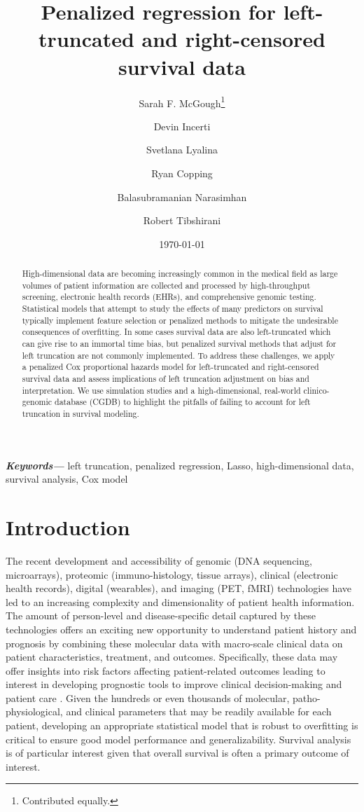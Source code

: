 \documentclass[11pt,final,fleqn]{article}\usepackage[]{graphicx}\usepackage[]{color}
\title{Penalized regression for left-truncated and right-censored survival data}
\author[1]{Sarah F. McGough\thanks{Contributed equally.}}
\author[1]{Devin Incerti\samethanks}
\author[1]{Svetlana Lyalina}
\author[1]{Ryan Copping}
\author[2, 3]{Balasubramanian Narasimhan}
\author[2, 3]{Robert Tibshirani}
\affil[1]{Genentech, Inc, South San Francisco, CA, USA}
\affil[2]{Department of Statistics, Stanford University, Stanford, CA, USA}
\affil[3]{Department of Biomedical Data Science, Stanford University, Stanford, CA, USA}
\date{\today}
\theoremstyle{plain}
\providecommand{\keywords}[1]
{
  \small	
  \textbf{\textit{Keywords---}} #1
}
\begin{document}
\maketitle

\begin{abstract}
    High-dimensional data are becoming increasingly common in the medical field as large volumes of patient information are collected and processed by high-throughput screening, electronic health records (EHRs), and comprehensive genomic testing. Statistical models that attempt to study the effects of many predictors on survival typically implement feature selection or penalized methods to mitigate the undesirable consequences of overfitting. In some cases survival data are also left-truncated which can give rise to an immortal time bias, but penalized survival methods that adjust for left truncation are not commonly implemented. To address these challenges, we apply a penalized Cox proportional hazards model for left-truncated and right-censored survival data and assess implications of left truncation adjustment on bias and interpretation. We use simulation studies and a high-dimensional, real-world clinico-genomic database (CGDB) to highlight the pitfalls of failing to account for left truncation in survival modeling.
\end{abstract}

\keywords{left truncation, penalized regression, Lasso, high-dimensional data, survival analysis, Cox model}

\section{Introduction}
The recent development and accessibility of genomic (DNA sequencing, microarrays), proteomic (immuno-histology, tissue arrays), clinical (electronic health records), digital (wearables), and imaging (PET, fMRI) technologies have led to an increasing complexity and dimensionality of patient health information. The amount of person-level and disease-specific detail captured by these technologies offers an exciting new opportunity to understand patient history and prognosis by combining these molecular data with macro-scale clinical data on patient characteristics, treatment, and outcomes. Specifically, these data may offer insights into risk factors affecting patient-related outcomes leading to interest in developing prognostic tools to improve clinical decision-making and patient care \cite{gui2005penalized, wishart2010predict, ow2016big, yousefi2017predicting}. Given the hundreds or even thousands of molecular, patho-physiological, and clinical parameters that may be readily available for each patient, developing an appropriate statistical model that is robust to overfitting is critical to ensure good model performance and generalizability. Survival analysis is of particular interest given that overall survival is often a primary outcome of interest.  
\end{document}
